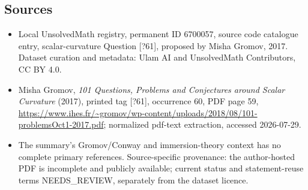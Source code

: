 \documentclass[11pt]{article}
\begin{document}
\subsection{Sources}
\begin{itemize}
\item Local UnsolvedMath registry, permanent ID 6700057, source code catalogue entry, scalar-curvature Question [?61], proposed by Misha Gromov, 2017. Dataset curation and metadata: Ulam AI and UnsolvedMath Contributors, CC BY 4.0.
\item Misha Gromov, \emph{101 Questions, Problems and Conjectures around Scalar Curvature} (2017), printed tag [?61], occurrence 60, PDF page 59, \url{https://www.ihes.fr/~gromov/wp-content/uploads/2018/08/101-problemsOct1-2017.pdf}; normalized pdf-text extraction, accessed 2026-07-29.
\item The summary's Gromov/Conway and immersion-theory context has no complete primary references. Source-specific provenance: the author-hosted PDF is incomplete and publicly available; current status and statement-reuse terms NEEDS\_REVIEW, separately from the dataset licence.
\end{itemize}
\end{document}
